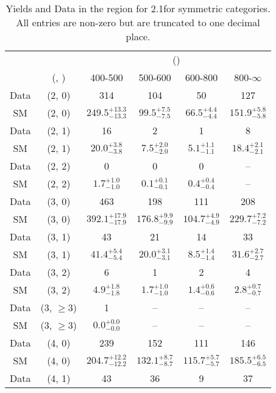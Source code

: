 \begin{table}[h!]
\tiny
\centering
\caption{Yields and Data in the \gj region for 2.1\ifb for symmetric categories. All entries are non-zero but are truncated to one decimal place.\label{tab:yieldsallqcd_gj_comb_sym}}
\begin{tabular}
{cccccc}
	\hline\hline
	&	& \multicolumn{4}{c}{\scalht (\gev)}\\ 
	&	 (\njet, \nb) & 400-500 & 500-600 & 600-800 & 800-$\infty$ \\ [0.8ex] 
\hline
	Data & (2, 0) & 314 & 104 & 50 & 127 \\[0.5ex] 
	SM & (2, 0) & $249.5^{+ 13.3 }_{- 13.3 }$ & $99.5^{+ 7.5 }_{- 7.5 }$ & $66.5^{+ 4.4 }_{- 4.4 }$ & $151.9^{+ 5.8 }_{- 5.8 }$ \\[0.5ex] 
	Data & (2, 1) & 16 & 2 & 1 & 8 \\[0.5ex] 
	SM & (2, 1) & $20.0^{+ 3.8 }_{- 3.8 }$ & $7.5^{+ 2.0 }_{- 2.0 }$ & $5.1^{+ 1.1 }_{- 1.1 }$ & $18.4^{+ 2.1 }_{- 2.1 }$ \\[0.5ex] 
	Data & (2, 2) & 0 & 0 & 0 & -- \\[0.5ex] 
	SM & (2, 2) & $1.7^{+ 1.0 }_{- 1.0 }$ & $0.1^{+ 0.1 }_{- 0.1 }$ & $0.4^{+ 0.4 }_{- 0.4 }$ & -- \\[0.5ex] 
	Data & (3, 0) & 463 & 198 & 111 & 208 \\[0.5ex] 
	SM & (3, 0) & $392.1^{+ 17.9 }_{- 17.9 }$ & $176.8^{+ 9.9 }_{- 9.9 }$ & $104.7^{+ 4.9 }_{- 4.9 }$ & $229.7^{+ 7.2 }_{- 7.2 }$ \\[0.5ex] 
	Data & (3, 1) & 43 & 21 & 14 & 33 \\[0.5ex] 
	SM & (3, 1) & $41.4^{+ 5.4 }_{- 5.4 }$ & $20.0^{+ 3.1 }_{- 3.1 }$ & $8.5^{+ 1.4 }_{- 1.4 }$ & $31.6^{+ 2.7 }_{- 2.7 }$ \\[0.5ex] 
	Data & (3, 2) & 6 & 1 & 2 & 4 \\[0.5ex] 
	SM & (3, 2) & $4.9^{+ 1.8 }_{- 1.8 }$ & $1.7^{+ 1.0 }_{- 1.0 }$ & $1.4^{+ 0.6 }_{- 0.6 }$ & $2.8^{+ 0.7 }_{- 0.7 }$ \\[0.5ex] 
	Data & (3, $\ge3$) & 1 & -- & -- & -- \\[0.5ex] 
	SM & (3, $\ge3$) & $0.0^{+ 0.0 }_{- 0.0 }$ & -- & -- & -- \\[0.5ex] 
	Data & (4, 0) & 239 & 152 & 111 & 146 \\[0.5ex] 
	SM & (4, 0) & $204.7^{+ 12.2 }_{- 12.2 }$ & $132.1^{+ 8.7 }_{- 8.7 }$ & $115.7^{+ 5.7 }_{- 5.7 }$ & $185.5^{+ 6.5 }_{- 6.5 }$ \\[0.5ex] 
	Data & (4, 1) & 43 & 36 & 9 & 37 \\[0.5ex] 

\end{tabular}
\end{table}
